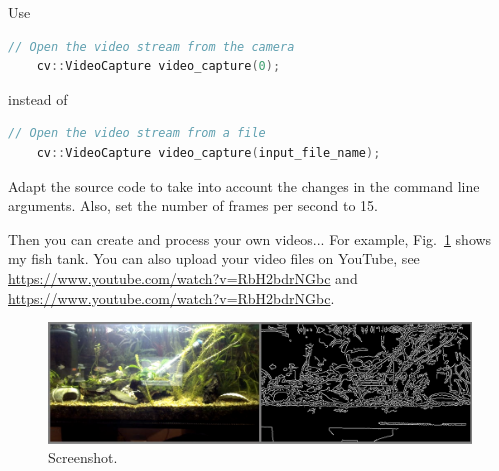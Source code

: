 \documentclass[english,a4paper,12pt,oneside]{article}
\begin{document}
Use 
\begin{lstlisting}[language=c++]
	// Open the video stream from the camera
	cv::VideoCapture video_capture(0);
\end{lstlisting}
instead of 
\begin{lstlisting}[language=c++]
	// Open the video stream from a file
	cv::VideoCapture video_capture(input_file_name);
\end{lstlisting}

Adapt the source code to take into account the changes in the command line arguments.
Also, set the number of frames per second to 15. 

Then you can create and process your own videos...
For example, Fig.~\ref{fig:screenshot2} shows my fish tank. You can also upload your video files on YouTube, see \url{https://www.youtube.com/watch?v=RbH2bdrNGbc} and \url{https://www.youtube.com/watch?v=RbH2bdrNGbc}.

 \begin{figure}[htbp]
  \centering
  \includegraphics[width=\linewidth]{screenshot2}
  \caption{\label{fig:screenshot2}Screenshot.}
 \end{figure}



%



\end{document}
